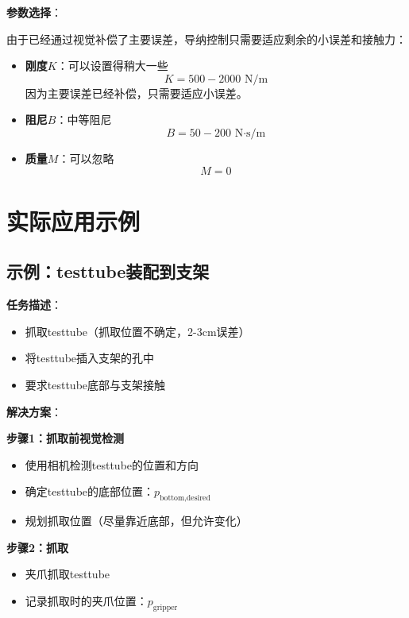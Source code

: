 \documentclass[12pt,a4paper]{article}
\begin{document}
\textbf{参数选择}：

由于已经通过视觉补偿了主要误差，导纳控制只需要适应剩余的小误差和接触力：

\begin{itemize}
\item \textbf{刚度$K$}：可以设置得稍大一些
\begin{equation}
K = 500-2000 \text{ N/m}
\end{equation}
因为主要误差已经补偿，只需要适应小误差。

\item \textbf{阻尼$B$}：中等阻尼
\begin{equation}
B = 50-200 \text{ N·s/m}
\end{equation}

\item \textbf{质量$M$}：可以忽略
\begin{equation}
M = 0
\end{equation}
\end{itemize}

\section{实际应用示例}

\subsection{示例：testtube装配到支架}

\textbf{任务描述}：
\begin{itemize}
\item 抓取testtube（抓取位置不确定，2-3cm误差）
\item 将testtube插入支架的孔中
\item 要求testtube底部与支架接触
\end{itemize}

\textbf{解决方案}：

\textbf{步骤1：抓取前视觉检测}
\begin{itemize}
\item 使用相机检测testtube的位置和方向
\item 确定testtube的底部位置：$p_{\text{bottom,desired}}$
\item 规划抓取位置（尽量靠近底部，但允许变化）
\end{itemize}

\textbf{步骤2：抓取}
\begin{itemize}
\item 夹爪抓取testtube
\item 记录抓取时的夹爪位置：$p_{\text{gripper}}$
\end{itemize}
\end{document}
